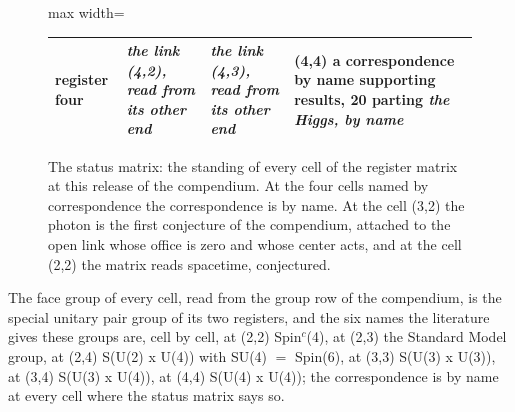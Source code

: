 \begin{figure}[htbp]
\begin{adjustbox}{max width=\linewidth}
\begin{tabular}{|p{14mm}|p{44mm}|p{44mm}|p{44mm}|}
\textbf{register four} & \emph{the link (4,2), read from its other end} & \emph{the link (4,3), read from its other end} & \textbf{(4,4)} \newline a correspondence by name \newline 25 supporting results, 20 parting \newline \emph{the Higgs, by name} \\ \hline
\end{tabular}\end{adjustbox}
\caption{The status matrix: the standing of every cell of the register matrix at this release of the compendium. At the four cells named by correspondence the correspondence is by name. At the cell (3,2) the photon is the first conjecture of the compendium, attached to the open link whose office is zero and whose center acts, and at the cell (2,2) the matrix reads spacetime, conjectured.}\label{fig:register-matrix-status}
\end{figure}
The face group of every cell, read from the group row of the compendium, is the special unitary pair group of its two registers, and the six names the literature gives these groups are, cell by cell, at (2,2) Spin$^{c}$(4), at (2,3) the Standard Model group, at (2,4) S(U(2) x U(4)) with SU(4) $=$ Spin(6), at (3,3) S(U(3) x U(3)), at (3,4) S(U(3) x U(4)), at (4,4) S(U(4) x U(4)); the correspondence is by name at every cell where the status matrix says so.
